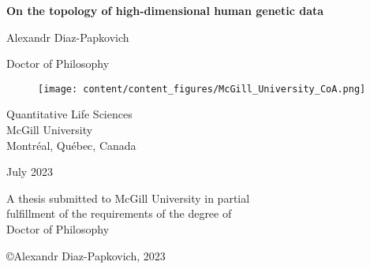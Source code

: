 \begin{titlepage}
\begin{center}







{\sf\bfseries\LARGE  On the topology of high-dimensional human genetic data }






{\large Alexandr Diaz-Papkovich}


Doctor of Philosophy


\begin{figure}[H]
\centering
\texttt{[image: content/content\_figures/McGill\_University\_CoA.png]}
\end{figure}

Quantitative Life Sciences\\
McGill University\\
Montr\'{e}al, Qu\'{e}bec, Canada\\

\vspace{1.5cm}


July 2023




\noindent
A thesis submitted to McGill University in partial\\
fulfillment of the requirements of the degree of\\
Doctor of Philosophy


\vspace{1.4cm}

{\small \copyright Alexandr Diaz-Papkovich, 2023}


\end{center}
\end{titlepage}





